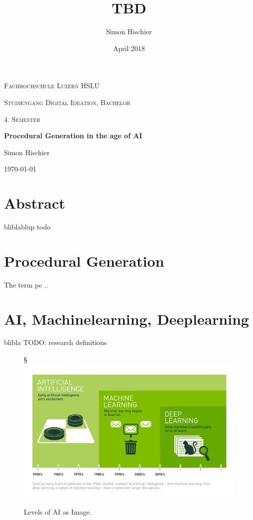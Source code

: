 \documentclass[10pt,a4paper]{article}
\title{TBD}
\author{Simon Hischier}
\date{April 2018}
\begin{document}
\begin{titlepage}
\centering
\vspace{1cm}
	{\scshape\LARGE Fachhochschule Luzern HSLU \par}
	\vspace{1cm}
	{\scshape\Large Studiengang Digital Ideation, Bachelor \par}
	
	{\scshape\Large 4. Semester\par}
	\vspace{1.5cm}
	{\huge\bf Procedural Generation in the age of AI\par}
	
	\vspace{10cm}
	{\Large Simon Hischier\par}
	\vfill

	{\large \today\par}
\end{titlepage}

\renewcommand{\contentsname}{Inhalt}
\tableofcontents
\newpage

\section{Abstract}
bliblablup todo

\section{Procedural Generation}
The term \gls{pc} ..

\section{AI, Machinelearning, Deeplearning}
\label{sec:AIMachinelearningDeeplearning}
blibla \cite{MichaelCopeland2016} TODO: research definitions
\begin{figure}[H]§
	\includegraphics[width=\textwidth, height=\textheight, keepaspectratio]{Deep_Learning_Icons_R5.png}
	\caption{Levels of AI as Image. \cite{MichaelCopeland2016}}
\end{figure}
\end{document}
